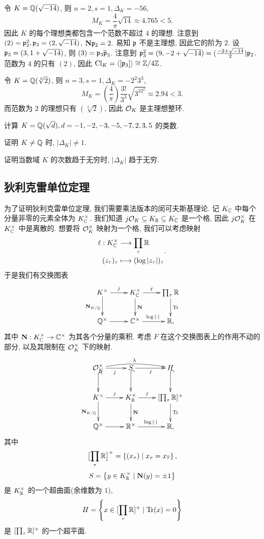 \begin{example}
令 $K={\mathbb{Q}}(\sqrt{-14})$, 则 $n=2, s=1,\Delta_K=-56$, 
  \[M_K=\frac{4}{\pi}\sqrt{14}\approx 4.765<5.\]
因此 $K$ 的每个理想类都包含一个范数不超过 $4$ 的理想. 注意到 $(2)={\mathfrak{p}}_2^2,{\mathfrak{p}}_2=(2,\sqrt{-14})$, ${\mathbf{N}}{\mathfrak{p}}_2=2.$ 易知 ${\mathfrak{p}}$ 不是主理想, 因此它的阶为 $2$. 设 ${\mathfrak{p}}_3=(3,1+\sqrt{-14})$, 则 $(3)={\mathfrak{p}}_3\overline {{\mathfrak{p}}}_3$. 注意到 ${\mathfrak{p}}_3^2=(9,-2+\sqrt{-14})=(\frac{-2+\sqrt{-14}}{2}){\mathfrak{p}}_2$. 范数为 $4$ 的只有 $(2)$, 因此 ${\mathrm{Cl}}_K=\langle{[{\mathfrak{p}}_3]}\rangle\cong{\mathbb{Z}}/4{\mathbb{Z}}$.
\end{example}
\begin{example}
令 $K={\mathbb{Q}}(\sqrt[3]2)$, 则 $n=3, s=1, \Delta_K=-2^2 3^3$,
  \[M_K=\left(\frac{4}{\pi}\right)\frac{3!}{3^3}\sqrt{3^32^2}\approx 2.94<3.\]
而范数为 $2$ 的理想只有 $(\sqrt[3]{2})$, 因此 ${\mathcal{O}}_K$ 是主理想整环.
\end{example}

\begin{exercise}
计算 $K={\mathbb{Q}}(\sqrt{d}),d=-1,-2,-3,-5,-7,2,3,5$ 的类数.
\end{exercise}

\begin{exercise}\label{exe:disc_not_pm1}
证明 $K\ne {\mathbb{Q}}$ 时, $|\Delta_K|\neq 1$.
\end{exercise}

\begin{exercise}
证明当数域 $K$ 的次数趋于无穷时, $|\Delta_K|$ 趋于无穷.
\end{exercise}


\subsection{狄利克雷单位定理}
为了证明狄利克雷单位定理, 我们需要乘法版本的闵可夫斯基理论.
记 $K_{\mathbb{C}}$ 中每个分量非零的元素全体为 $K_{\mathbb{C}}^\times$.
我们知道 $j{\mathcal{O}}_K\subseteq K_{\mathbb{R}}\subseteq K_{\mathbb{C}}$ 是一个格, 因此 $j{\mathcal{O}}_K^\times$ 在 $K_{\mathbb{C}}^\times$ 中是离散的. 想要将 ${\mathcal{O}}_K^\times$ 映射为一个格, 我们可以考虑映射
  \[\begin{split}\ell:K_{\mathbb{C}}^\times &\longrightarrow \prod_\tau{\mathbb{R}} \\ (z_\tau)_\tau &\longmapsto (\log|z_\tau|)_\tau\end{split}.\]
于是我们有交换图表
  \[\xymatrix{
    K^\times\ar[r]^j\ar[d]_{\bfN_{K/\BQ}} & K_\BC^\times \ar[r]^-\ell\ar[d]^\bfN & \prod_\tau \BR\ar[d]^\Tr\\
    \BQ^\times\ar[r]&\BC^\times\ar[r]^{\log|\cdot|}&\BR,
  }\]
其中 ${\mathbf{N}}:K_{\mathbb{C}}^\times\to{\mathbb{C}}^\times$ 为其各个分量的乘积.
考虑 $F$ 在这个交换图表上的作用不动的部分, 以及其限制在 ${\mathcal{O}}_K^\times$ 下的映射.
  \[\xymatrix{
    \CO_K^\times\ar[r]_j\ar@{^(->}[d]\ar@/^/[rr]^{\lambda}
    &S\ar[r]_\ell\ar@{^(->}[d]
    &H\ar@{^(->}[d]\\
    K^\times\ar[r]^j\ar[d]_{\bfN_{K/\BQ}} & K_\BR^\times \ar[r]^-\ell\ar[d]^\bfN & [\prod_\tau \BR]^+\ar[d]^\Tr\\
    \BQ^\times\ar[r]&\BR^\times\ar[r]^{\log|\cdot|}&\BR,
  }\]
其中 
  \[\bigl[\prod_\tau {\mathbb{R}}\bigr]^+=\left\{(x_\tau)\mid x_{\tau}=x_{\overline \tau}\right\},\]
  \[S=\left\{y\in K_{\mathbb{R}}^\times\mid {\mathbf{N}}(y)=\pm 1\right\}\]
是 $K_{\mathbb{R}}^\times$ 的一个超曲面(余维数为 $1$),
  \[H=\left\{x\in [\prod_\tau {\mathbb{R}}]^+\mid {\mathrm{Tr}}(x)=0\right\}\]
是 $[\prod_\tau {\mathbb{R}}]^+$ 的一个超平面.

